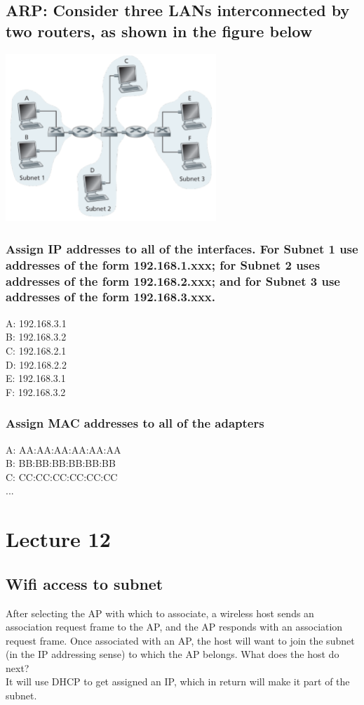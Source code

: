 \documentclass[12pt, a4paper]{article}
\begin{document}
		\subsection{ARP:  Consider three LANs interconnected by two routers, as shown in the figure below}
			\includegraphics[width=300px]{assets/11.3.png}\\
			\subsubsection{Assign IP addresses to all of the interfaces. For Subnet 1 use addresses of the form 192.168.1.xxx; for Subnet 2 uses addresses of the form 192.168.2.xxx; and for Subnet 3 use addresses of the form 192.168.3.xxx.}
				A: 192.168.3.1\\
				B: 192.168.3.2\\
				C: 192.168.2.1\\
				D: 192.168.2.2\\
				E: 192.168.3.1\\
				F: 192.168.3.2
			\subsubsection{Assign MAC addresses to all of the adapters}
				A: AA:AA:AA:AA:AA:AA\\
				B: BB:BB:BB:BB:BB:BB\\
				C: CC:CC:CC:CC:CC:CC\\
				...
	\section{Lecture 12}
		\subsection{Wifi access to subnet}
			After selecting the AP with which to associate, a wireless host sends an association request frame to the AP, and the AP responds with an association request frame. Once associated with an AP, the host will want to join the subnet (in the IP addressing sense) to which the AP belongs. What does the host do next?\\
			It will use DHCP to get assigned an IP, which in return will make it part of the subnet.
\end{document}
